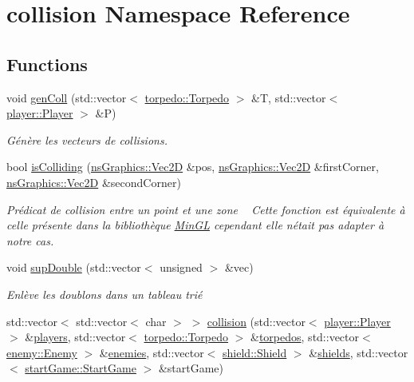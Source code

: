 \hypertarget{namespacecollision}{}\section{collision Namespace Reference}
\label{namespacecollision}
\subsection*{Functions}
\begin{DoxyCompactItemize}
\item 
void \hyperlink{namespacecollision_adede7fb38a79d23854557f97f8a37068}{gen\+Coll} (std\+::vector$<$ \hyperlink{structtorpedo_1_1_torpedo}{torpedo\+::\+Torpedo} $>$ \&T, std\+::vector$<$ \hyperlink{structplayer_1_1_player}{player\+::\+Player} $>$ \&P)
\begin{DoxyCompactList}\small\item\em Génère les vecteurs de collisions. \end{DoxyCompactList}\item 
bool \hyperlink{namespacecollision_a84b9e926c787ba05c5b5124ef28ecf88}{is\+Colliding} (\hyperlink{classns_graphics_1_1_vec2_d}{ns\+Graphics\+::\+Vec2D} \&pos, \hyperlink{classns_graphics_1_1_vec2_d}{ns\+Graphics\+::\+Vec2D} \&first\+Corner, \hyperlink{classns_graphics_1_1_vec2_d}{ns\+Graphics\+::\+Vec2D} \&second\+Corner)
\begin{DoxyCompactList}\small\item\em Prédicat de collision entre un point et une zone ~\newline
 Cette fonction est équivalente à celle présente dans la bibliothèque \hyperlink{class_min_g_l}{Min\+GL} cependant elle n\textquotesingle{}était pas adapter à notre cas. \end{DoxyCompactList}\item 
void \hyperlink{namespacecollision_a451676809547856fc6f86b3dd6dc7c23}{sup\+Double} (std\+::vector$<$ unsigned $>$ \&vec)
\begin{DoxyCompactList}\small\item\em Enlève les doublons dans un tableau trié \end{DoxyCompactList}\item 
std\+::vector$<$ std\+::vector$<$ char $>$ $>$ \hyperlink{namespacecollision_ae1b29fbda8203c6556c2038306ce36e7}{collision} (std\+::vector$<$ \hyperlink{structplayer_1_1_player}{player\+::\+Player} $>$ \&\hyperlink{multi_8cpp_abd9de51dc9a6f90588878ff69cec449d}{players}, std\+::vector$<$ \hyperlink{structtorpedo_1_1_torpedo}{torpedo\+::\+Torpedo} $>$ \&\hyperlink{multi_8cpp_a8d978ee3afff71f0b07f921403c2b403}{torpedos}, std\+::vector$<$ \hyperlink{structenemy_1_1_enemy}{enemy\+::\+Enemy} $>$ \&\hyperlink{multi_8cpp_a68dfd8cc6c330a8d7be4cf2f3a6892f3}{enemies}, std\+::vector$<$ \hyperlink{structshield_1_1_shield}{shield\+::\+Shield} $>$ \&\hyperlink{multi_8cpp_a7579d4d68d6c54e66480c4518dd61d70}{shields}, std\+::vector$<$ \hyperlink{structstart_game_1_1_start_game}{start\+Game\+::\+Start\+Game} $>$ \&start\+Game)

\end{DoxyCompactItemize}
